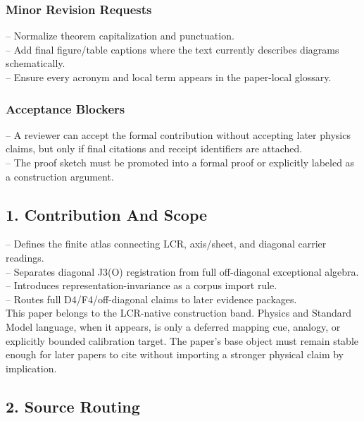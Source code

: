 \documentclass[11pt]{article}
\begin{document}
\subsubsection*{Minor Revision Requests}

\noindent{}-- Normalize theorem capitalization and punctuation.\\
\noindent{}-- Add final figure/table captions where the text currently describes diagrams schematically.\\
\noindent{}-- Ensure every acronym and local term appears in the paper-local glossary.\\

\subsubsection*{Acceptance Blockers}

\noindent{}-- A reviewer can accept the formal contribution without accepting later physics claims, but only if final citations and receipt identifiers are attached.\\
\noindent{}-- The proof sketch must be promoted into a formal proof or explicitly labeled as a construction argument.\\


\subsection*{1. Contribution And Scope}

\noindent{}-- Defines the finite atlas connecting LCR, axis/sheet, and diagonal carrier readings.\\
\noindent{}-- Separates diagonal J3(O) registration from full off-diagonal exceptional algebra.\\
\noindent{}-- Introduces representation-invariance as a corpus import rule.\\
\noindent{}-- Routes full D4/F4/off-diagonal claims to later evidence packages.\\

This paper belongs to the LCR-native construction band. Physics and Standard Model language, when it appears, is only a deferred mapping cue, analogy, or explicitly bounded calibration target. The paper's base object must remain stable enough for later papers to cite without importing a stronger physical claim by implication.

\subsection*{2. Source Routing}
\end{document}
